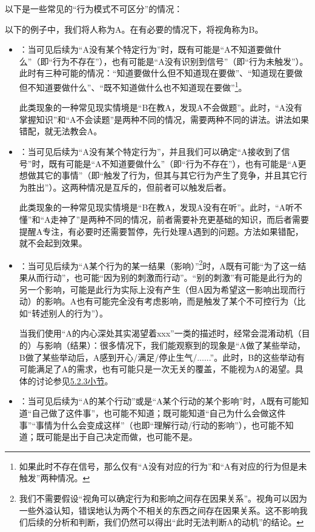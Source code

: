以下是一些常见的“行为模式不可区分”的情况：
\begin{explain}
以下的例子中，我们将人称为A。在有必要的情况下，将视角称为B。
\begin{itemize}
\item {}：当可见后续为“A没有某个特定行为”时，既有可能是“A不知道要做什么”（即“行为不存在”），也有可能是“A没有识别到信号”（即“行为未触发”）。此时有三种可能的情况：“知道要做什么但不知道现在要做”、“知道现在要做但不知道要做什么”、“既不知道做什么也不知道现在要做”\footnote{如果此时不存在信号，那么仅有“A没有对应的行为”和“A有对应的行为但是未触发”两种情况。}。

此类现象的一种常见现实情境是“B在教A，发现A不会做题”。此时，“A没有掌握知识”和“A不会读题”是两种不同的情况，需要两种不同的讲法。讲法如果错配，就无法教会A。

\item \label{para:被覆盖与缺失}：当可见后续为“A没有某个特定行为”，并且我们可以确定“A接收到了信号”时，既有可能是“A不知道要做什么”（即“行为不存在”），也有可能是“A更想做其它的事情”（即“触发了行为，但其与其它行为产生了竞争，并且其它行为胜出”）。这两种情况是互斥的，但前者可以触发后者。

此类现象的一种常见现实情境是“B在教A，发现A没有在听”。此时，“A听不懂”和“A走神了”是两种不同的情况，前者需要补充更基础的知识，而后者需要提醒A专注，有必要时还需要暂停，先行处理A遇到的问题。方法如果错配，就不会起到效果。

\item {}：当可见后续为“A某个行为的某一结果（影响）”\footnote{我们不需要假设“视角可以确定行为和影响之间存在因果关系”。视角可以因为一些外溢认知，错误地认为两个不相关的东西之间存在因果关系。这不影响我们后续的分析和判断，我们仍然可以得出“此时无法判断A的动机”的结论。}时，A既有可能“为了这一结果从而行动”，也可能“因为别的刺激而行动”。“别的刺激”有可能是此行为的另一个影响，可能是此行为实际上没有产生（但A因为希望这一影响出现而行动）的影响。A也有可能完全没有考虑影响，而是触发了某个不可控行为（比如“转述别人的行为”）。

当我们使用“A的内心深处其实渴望着xxx”一类的描述时，经常会混淆动机（目的）与影响（结果）：很多情况下，我们能观察到的现象是“A做了某些举动，B做了某些举动后，A感到开心/满足/停止生气/......”。此时，B的这些举动有可能满足了A的需求，也有可能只是一次无关的覆盖，不能视为A的渴望。具体的讨论参见\hyperref[sec:局部有效理论]{5.2.3小节}。

\item {}：当可见后续为“A的某个行动”或是“A某个行动的某个影响”时，A既有可能知道“自己做了这件事”，也可能不知道；既可能知道“自己为什么会做这件事”“事情为什么会变成这样”（也即“理解行动/行动的影响”），也可能不知道；既可能是出于自己决定而做，也可能不是。


\end{itemize}
\end{explain}
